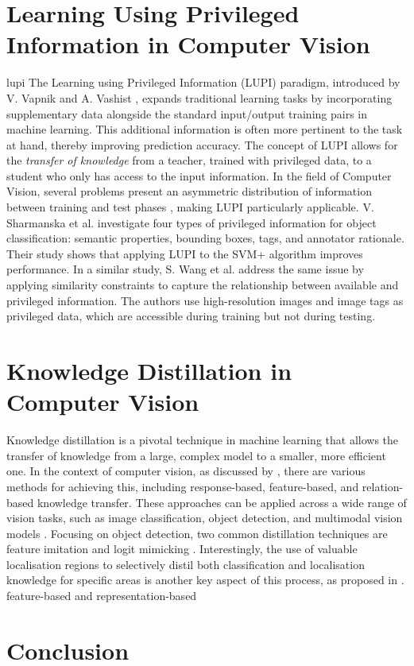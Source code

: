 \section{Learning Using Privileged Information in Computer Vision}
\label{subsec:2_lupi}
\gls{lupi}
The Learning using Privileged Information (LUPI) paradigm, introduced by V. Vapnik and A. Vashist \cite{lupi, Vapnik2015LearningUP}, expands traditional learning tasks by incorporating supplementary data alongside the standard input/output training pairs in machine learning. This additional information is often more pertinent to the task at hand, thereby improving prediction accuracy. The concept of LUPI allows for the \textit{transfer of knowledge} from a teacher, trained with privileged data, to a student who only has access to the input information.
In the field of Computer Vision, several problems present an asymmetric distribution of information between training and test phases \cite{learning2rank}, making LUPI particularly applicable. V. Sharmanska et al. \cite{learning2rank} investigate four types of privileged information for object classification: semantic properties, bounding boxes, tags, and annotator rationale. Their study shows that applying LUPI to the SVM+ algorithm improves performance.
In a similar study, S. Wang et al. \cite{lupi_classification} address the same issue by applying similarity constraints to capture the relationship between available and privileged information. The authors use high-resolution images and image tags as privileged data, which are accessible during training but not during testing.

\section{Knowledge Distillation in Computer Vision}
\label{subsec:2_distillation}
Knowledge distillation is a pivotal technique in machine learning that allows the transfer of knowledge from a large, complex model to a smaller, more efficient one. In the context of computer vision, as discussed by \cite{distillation1}, there are various methods for achieving this, including response-based, feature-based, and relation-based knowledge transfer. These approaches can be applied across a wide range of vision tasks, such as image classification, object detection, and multimodal vision models \cite{distillation1}. Focusing on object detection, two common distillation techniques are feature imitation and logit mimicking \cite{distillation2}. Interestingly, the use of valuable localisation regions to selectively distil both classification and localisation knowledge for specific areas is another key aspect of this process, as proposed in \cite{distillation2}.
feature-based and representation-based


\section{Conclusion}
\label{sec:3_conclusion}